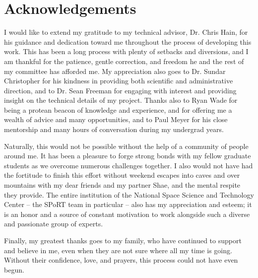 \chapter{Acknowledgements}
\doublespacing

I would like to extend my gratitude to my technical advisor, Dr. Chris Hain, for his guidance and dedication toward me throughout the process of developing this work. This has been a long process with plenty of setbacks and diversions, and I am thankful for the patience, gentle correction, and freedom he and the rest of my committee has afforded me. My appreciation also goes to Dr. Sundar Christopher for his kindness in providing both scientific and administrative direction, and to Dr. Sean Freeman for engaging with interest and providing insight on the technical details of my project. Thanks also to Ryan Wade for being a protean beacon of knowledge and experience, and for offering me a wealth of advice and many opportunities, and to Paul Meyer for his close mentorship and many hours of conversation during my undergrad years.

Naturally, this would not be possible without the help of a community of people around me. It has been a pleasure to forge strong bonds with my fellow graduate students as we overcome numerous challenges together. I also would not have had the fortitude to finish this effort without weekend escapes into caves and over mountains with my dear friends and my partner Shae, and the mental respite they provide. The entire institution of the National Space Science and Technology Center -- the SPoRT team in particular -- also has my appreciation and esteem; it is an honor and a source of constant motivation to work alongside such a diverse and passionate group of experts.

Finally, my greatest thanks goes to my family, who have continued to support and believe in me, even when they are not sure where all my time is going. Without their confidence, love, and prayers, this process could not have even begun.
